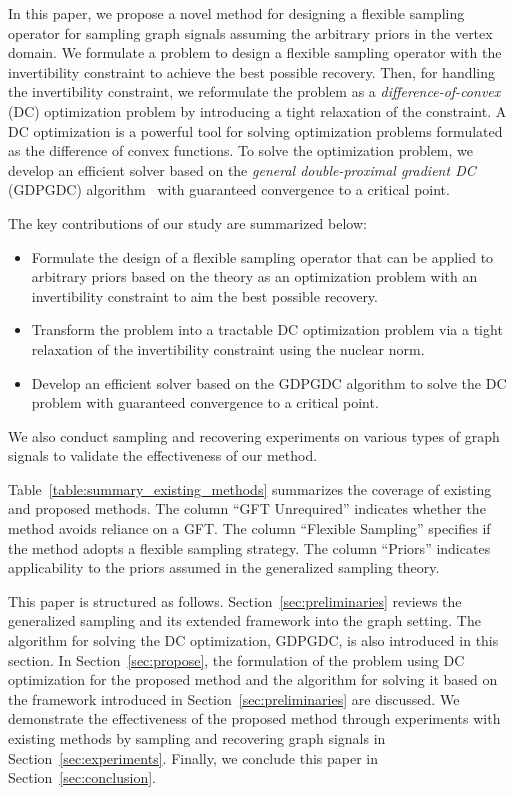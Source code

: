 \documentclass[journal]{IEEEtran}
\begin{document}
In this paper, we propose a novel method for designing a flexible sampling operator for sampling graph signals assuming the arbitrary priors in the vertex domain.
We formulate a problem to design a flexible sampling operator with the invertibility constraint to achieve the best possible recovery.
Then, for handling the invertibility constraint, we reformulate the problem as a \textit{difference-of-convex} (DC) optimization problem by introducing a tight relaxation of the constraint.
A DC optimization is a powerful tool for solving optimization problems formulated as the difference of convex functions.
To solve the optimization problem, we develop an efficient solver based on the \textit{general double-proximal gradient DC} (GDPGDC) algorithm~\cite{banert2019general} with guaranteed convergence to a critical point.

The key contributions of our study are summarized below:

\begin{itemize}[align=parleft, left=1.1mm, labelsep=1.1mm, itemindent=0mm]
    \item Formulate the design of a flexible sampling operator that can be applied to arbitrary priors based on the theory as an optimization problem with an invertibility constraint to aim the best possible recovery.
    \item Transform the problem into a tractable DC optimization problem via a tight relaxation of the invertibility constraint using the nuclear norm.
    \item Develop an efficient solver based on the GDPGDC algorithm to solve the DC problem with guaranteed convergence to a critical point.
\end{itemize}

We also conduct sampling and recovering experiments on various types of graph signals to validate the effectiveness of our method.

Table~\ref{table:summary_existing_methods} summarizes the coverage of existing and proposed methods. 
The column “GFT Unrequired” indicates whether the method avoids reliance on a GFT.
The column “Flexible Sampling” specifies if the method adopts a flexible sampling strategy. 
The column “Priors” indicates applicability to the priors assumed in the generalized sampling theory.


This paper is structured as follows.
Section~\ref{sec:preliminaries} reviews the generalized sampling and its extended framework into the graph setting.
The algorithm for solving the DC optimization, GDPGDC, is also introduced in this section.
In Section~\ref{sec:propose}, the formulation of the problem using DC optimization for the proposed method and the algorithm for solving it based on the framework introduced in Section~\ref{sec:preliminaries} are discussed. 
We demonstrate the effectiveness of the proposed method through experiments with existing methods by sampling and recovering graph signals in Section~\ref{sec:experiments}.
Finally, we conclude this paper in Section~\ref{sec:conclusion}.
\end{document}
